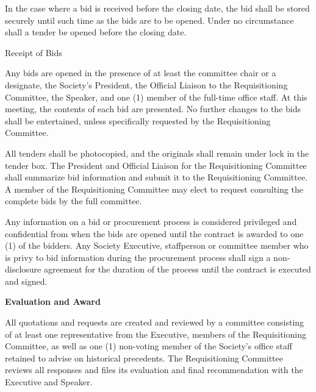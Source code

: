 \begin{longenum}[label*=\thesection.\arabic*., align=left]
\begin{longenum} [label*=\arabic*., align=left]
		\item In the case where a bid is received before the closing date, the bid shall be stored securely until such time as the bids are to be opened. Under no circumstance shall a tender be opened before the closing date.
\end{longenum}

\item \textbf\textit{}{Receipt of Bids}

\begin{longenum} [label*=\arabic*., align=left]
		\item Any bids are opened in the presence of at least the committee chair or a designate, the Society's President, the Official Liaison to the Requisitioning Committee, the Speaker, and one (1) member of the full-time office staff. At this meeting, the contents of each bid are presented. No further changes to the bids shall be entertained, unless specifically requested by the Requisitioning Committee.
		
		\item All tenders shall be photocopied, and the originals shall remain under lock in the tender box. The President and Official Liaison for the Requisitioning Committee shall summarize bid information and submit it to the Requisitioning Committee. A member of the Requisitioning Committee may elect to request consulting the complete bids by the full committee.
		
		\item Any information on a bid or procurement process is considered privileged and confidential from when the bids are opened until the contract is awarded to one (1) of the bidders. Any Society Executive, staffperson or committee member who is privy to bid information during the procurement process shall sign a non-disclosure agreement for the duration of the process until the contract is executed and signed.
\end{longenum}


\item \textbf{Evaluation and Award}

\begin{longenum} [label*=\arabic*., align=left]
		\item All quotations and requests are created and reviewed by a committee consisting of at least one representative from the Executive, members of the Requisitioning Committee, as well as one (1) non-voting member of the Society's office staff retained to advise on historical precedents. The Requisitioning Committee reviews all responses and files its evaluation and final recommendation with the Executive and Speaker. 
		

\end{longenum}
\end{longenum}
